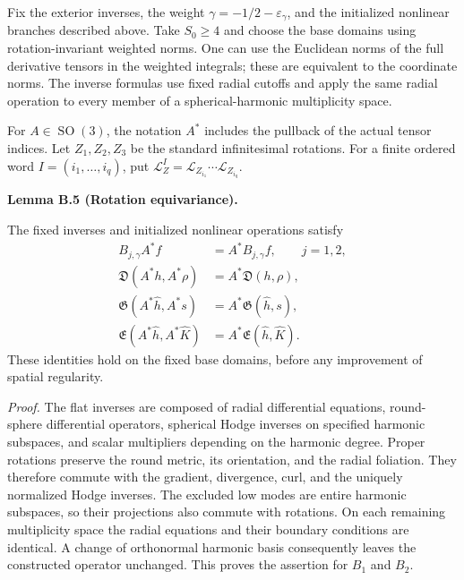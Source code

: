 \documentclass[
  english,
  11pt,
  reqno]{amsart}
\makeatletter
\newcommand{\pandocstatementheading}[1]{%
  \par\if@nobreak\else
    \addpenalty{\@beginparpenalty}%
    \addvspace{.5\baselineskip plus .2\baselineskip minus .2\baselineskip}%
  \fi
  {\normalfont\bfseries #1\par}%
  \nobreak\@afterindenttrue\@afterheading
}
\makeatother
\begin{document}
Fix the exterior inverses, the weight
\(\gamma=-1/2-\varepsilon_\gamma\), and the initialized nonlinear
branches described above. Take \(S_0\ge4\) and choose the base domains
using rotation-invariant weighted norms. One can use the Euclidean norms
of the full derivative tensors in the weighted integrals; these are
equivalent to the coordinate norms. The inverse formulas use fixed
radial cutoffs and apply the same radial operation to every member of a
spherical-harmonic multiplicity space.

For \(A\in\operatorname{SO}(3)\), the notation \(A^*\) includes the
pullback of the actual tensor indices. Let \(Z_1,Z_2,Z_3\) be the
standard infinitesimal rotations. For a finite ordered word
\(I=(i_1,\ldots,i_q)\), put
\(\mathcal L_Z^I=\mathcal L_{Z_{i_1}}\cdots\mathcal L_{Z_{i_q}}\).

\pandocstatementheading{\leavevmode{}\label{lem:online-extension-rotation-equivariance}Lemma B.5 (Rotation equivariance).}

The fixed inverses and initialized nonlinear operations satisfy%
 \[
\begin{aligned}
B_{j,\gamma}A^*f&=A^*B_{j,\gamma}f,\qquad j=1,2,\\
\mathfrak D(A^*h,A^*\rho)&=A^*\mathfrak D(h,\rho),\\
\mathfrak G(A^*\widehat h,A^*s)&=A^*\mathfrak G(\widehat h,s),\\
\mathfrak E(A^*\widehat h,A^*\widehat K)
&=A^*\mathfrak E(\widehat h,\widehat K).
\end{aligned}
\] These identities hold on the fixed base domains, before any
improvement of spatial regularity.

\emph{Proof.} The flat inverses are composed of radial differential
equations, round-sphere differential operators, spherical Hodge inverses
on specified harmonic subspaces, and scalar multipliers depending on the
harmonic degree. Proper rotations preserve the round metric, its
orientation, and the radial foliation. They therefore commute with the
gradient, divergence, curl, and the uniquely normalized Hodge inverses.
The excluded low modes are entire harmonic subspaces, so their
projections also commute with rotations. On each remaining multiplicity
space the radial equations and their boundary conditions are identical.
A change of orthonormal harmonic basis consequently leaves the
constructed operator unchanged. This proves the assertion for \(B_1\)
and \(B_2\).
\end{document}
